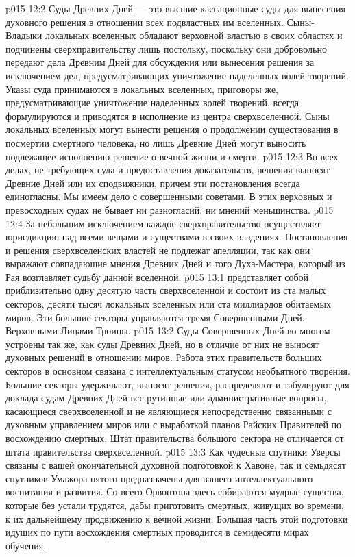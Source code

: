\vs p015 12:2 Суды Древних Дней --- это высшие кассационные суды для вынесения духовного решения в отношении всех подвластных им вселенных. Сыны\hyp{}Владыки локальных вселенных обладают верховной властью в своих областях и подчинены сверхправительству лишь постольку, поскольку они добровольно передают дела Древним Дней для обсуждения или вынесения решения за исключением дел, предусматривающих уничтожение наделенных волей творений. Указы суда принимаются в локальных вселенных, приговоры же, предусматривающие уничтожение наделенных волей творений, всегда формулируются и приводятся в исполнение из центра сверхвселенной. Сыны локальных вселенных могут вынести решения о продолжении существования в посмертии смертного человека, но лишь Древние Дней могут выносить подлежащее исполнению решение о вечной жизни и смерти.
\vs p015 12:3 Во всех делах, не требующих суда и предоставления доказательств, решения выносят Древние Дней или их сподвижники, причем эти постановления всегда единогласны. Мы имеем дело с совершенными советами. В этих верховных и превосходных судах не бывает ни разногласий, ни мнений меньшинства.
\vs p015 12:4 За небольшим исключением каждое сверхправительство осуществляет юрисдикцию над всеми вещами и существами в своих владениях. Постановления и решения сверхвселенских властей не подлежат апелляции, так как они выражают совпадающие мнения Древних Дней и того Духа\hyp{}Мастера, который из Рая возглавляет судьбу данной вселенной.
\vs p015 13:1  представляет собой приблизительно одну десятую часть сверхвселенной и состоит из ста малых секторов, десяти тысяч локальных вселенных или ста миллиардов обитаемых миров. Эти большие секторы управляются тремя Совершенными Дней, Верховными Лицами Троицы.
\vs p015 13:2 Суды Совершенных Дней во многом устроены так же, как суды Древних Дней, но в отличие от них не выносят духовных решений в отношении миров. Работа этих правительств больших секторов в основном связана с интеллектуальным статусом необъятного творения. Большие секторы удерживают, выносят решения, распределяют и табулируют для доклада судам Древних Дней все рутинные или административные вопросы, касающиеся сверхвселенной и не являющиеся непосредственно связанными с духовным управлением миров или с выработкой планов Райских Правителей по восхождению смертных. Штат правительства большого сектора не отличается от штата правительства сверхвселенной.
\vs p015 13:3 Как чудесные спутники Уверсы связаны с вашей окончательной духовной подготовкой к Хавоне, так и семьдясят спутников Умажора пятого предназначены для вашего интеллектуального воспитания и развития. Со всего Орвонтона здесь собираются мудрые существа, которые без устали трудятся, дабы приготовить смертных, живущих во времени, к их дальнейшему продвижению к вечной жизни. Большая часть этой подготовки идущих по пути восхождения смертных проводится в семидесяти мирах обучения.
